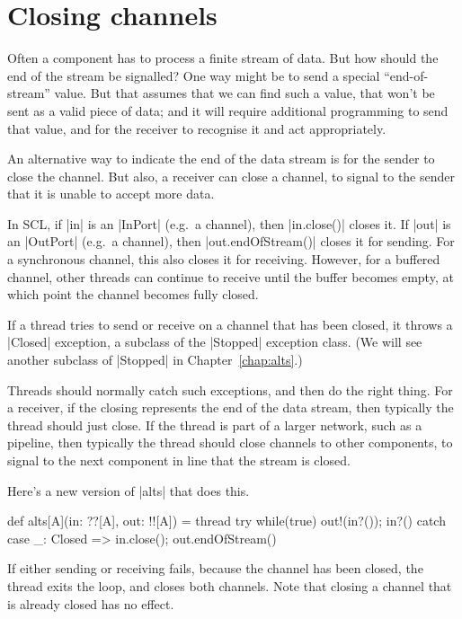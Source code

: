 \section{Closing channels}

Often a component has to process a finite stream of data.  But how should the
end of the stream be signalled?  One way might be to send a special
``end-of-stream'' value.  But that assumes that we can find such a value, that
won't be sent as a valid piece of data; and it will require additional
programming to send that value, and for the receiver to recognise it and act
appropriately. 

An alternative way to indicate the end of the data stream is for the sender to
close the channel.  But also, a receiver can close a channel, to signal to the
sender that it is unable to accept more data.

In SCL, if |in| is an |InPort| (e.g.~a channel), then |in.close()| closes it.
%
If |out| is an |OutPort| (e.g.~a channel), then |out.endOfStream()| closes it
for sending.  For a synchronous channel, this also closes it for receiving.
However, for a buffered channel, other threads can continue to receive until
the buffer becomes empty, at which point the channel becomes fully closed.


If a thread tries to send or receive on a channel that has been closed, it
throws a |Closed| exception, a subclass of the |Stopped| exception class.
(We will see another subclass of |Stopped| in Chapter~\ref{chap:alts}.)

Threads should normally catch such exceptions, and then do the right thing.
For a receiver, if the closing represents the end of the data stream, then
typically the thread should just close.  If the thread is part of a larger
network, such as a pipeline, then typically the thread should close channels
to other components, to signal to the next component in line that the stream
is closed.


Here's a new version of |alts| that does this.
%
\begin{scala}
def alts[A](in: ??[A], out: !![A]) = thread{ 
  try{ while(true){ out!(in?()); in?() } } 
  catch{ case _: Closed => in.close(); out.endOfStream() }
}
\end{scala}
% 
If either sending or receiving fails, because the channel has been closed, the
thread exits the loop, and closes both channels.  Note that closing a channel
that is already closed has no effect.

